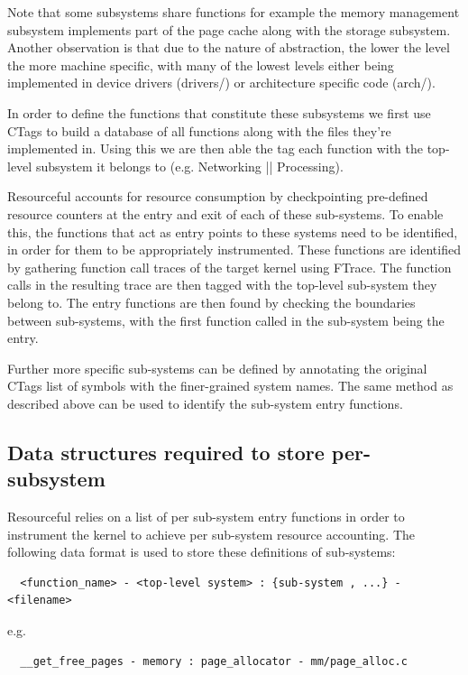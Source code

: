 \documentclass[12pt]{article}
\begin{document}
  Note that some subsystems share functions for example the memory management subsystem implements part of the page cache along with the storage subsystem.
  Another observation is that due to the nature of abstraction, the lower the level the more machine specific, with many of the lowest levels either being implemented in device drivers (drivers/) or architecture specific code (arch/).


  In order to define the functions that constitute these subsystems we first use CTags to build a database of all functions along with the files they’re implemented in.
  Using this we are then able the tag each function with the top-level subsystem it belongs to (e.g. Networking || Processing).


  Resourceful accounts for resource consumption by checkpointing pre-defined resource counters at the entry and exit of each of these sub-systems.
  To enable this, the functions that act as entry points to these systems need to be identified, in order for them to be appropriately instrumented.
  These functions are identified by gathering function call traces of the target kernel using FTrace.
  The function calls in the resulting trace are then tagged with the top-level sub-system they belong to.
  The entry functions are then found by checking the boundaries between sub-systems, with the first function called in the sub-system being the entry.


  Further more specific sub-systems can be defined by annotating the original CTags list of symbols with the finer-grained system names. The same method as described above can be used to identify the sub-system entry functions.

  \subsection{Data structures required to store per-subsystem}
  Resourceful relies on a list of per sub-system entry functions in order to instrument the kernel to achieve per sub-system resource accounting. The following data format is used to store these definitions of sub-systems:

  \begin{lstlisting}
  <function_name> - <top-level system> : {sub-system , ...} - <filename>
  \end{lstlisting}

  e.g.
  \begin{lstlisting}
  __get_free_pages - memory : page_allocator - mm/page_alloc.c
  \end{lstlisting}
\end{document}

